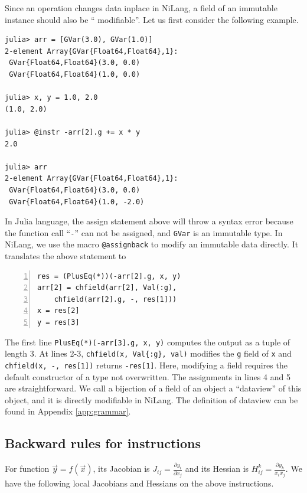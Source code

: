 \documentclass{article}
\newcommand{\<}{\langle}
\renewcommand{\>}{\rangle}
\newcommand{\App}[1]{Appendix \ref{#1}}
\theoremstyle{definition}\newtheorem{definition}{\textit{Definition}}
\begin{document}
Since an operation changes data inplace in NiLang, a field of an immutable instance should also be `` modifiable''.
Let us first consider the following example.

\begin{minipage}{.88\columnwidth}
\begin{lstlisting}
julia> arr = [GVar(3.0), GVar(1.0)]
2-element Array{GVar{Float64,Float64},1}:
 GVar{Float64,Float64}(3.0, 0.0)
 GVar{Float64,Float64}(1.0, 0.0)

julia> x, y = 1.0, 2.0
(1.0, 2.0)

julia> @instr -arr[2].g += x * y
2.0

julia> arr
2-element Array{GVar{Float64,Float64},1}:
 GVar{Float64,Float64}(3.0, 0.0) 
 GVar{Float64,Float64}(1.0, -2.0)
\end{lstlisting}
\end{minipage}

In Julia language, the assign statement above will throw a syntax error because the function call ``\texttt{-}'' can not be assigned, and \texttt{GVar} is an immutable type.
In NiLang, we use the macro \texttt{@assignback} to modify an immutable data directly. It translates the above statement to

\begin{minipage}{.88\columnwidth}
\begin{lstlisting}[numberstyle=\scriptsize\color{gray},numbers=left,numbersep=8pt]
res = (PlusEq(*))(-arr[2].g, x, y)
arr[2] = chfield(arr[2], Val(:g),
    chfield(arr[2].g, -, res[1]))
x = res[2]
y = res[3]
\end{lstlisting}
\end{minipage}

The first line \texttt{PlusEq(*)(-arr[3].g, x, y)} computes the output as a tuple of length $3$.
At lines 2-3, \texttt{chfield(x, Val\{:g\}, val)} modifies the \texttt{g} field of \texttt{x} and \texttt{chfield(x, -, res[1])} returns \texttt{-res[1]}. Here, modifying a field requires the default constructor of a type not overwritten.
The assignments in lines 4 and 5 are straightforward.
We call a bijection of a field of an object a ``dataview'' of this object, and it is directly modifiable in NiLang.
The definition of dataview can be found in \App{app:grammar}.


\subsection{Backward rules for instructions}\label{app:jacobians}
For function $\vec{y} = f(\vec{x})$, its Jacobian is $J_{ij} = \frac{\partial y_i}{\partial x_j}$ and its Hessian is $H^k_{ij} = \frac{\partial y_k}{x_i x_j}$.
We have the following local Jacobians and Hessians on the above instructions.
\end{document}
